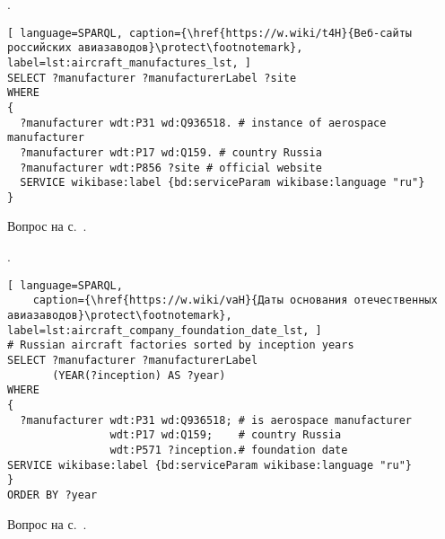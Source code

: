 \begin{task}
    \label{answer:aircraft_manufacturers}
    . 
    
	\begin{lstlisting}[ language=SPARQL, caption={\href{https://w.wiki/t4H}{Веб-сайты российских авиазаводов}\protect\footnotemark}, label=lst:aircraft_manufactures_lst, ]
SELECT ?manufacturer ?manufacturerLabel ?site
WHERE
{
  ?manufacturer wdt:P31 wd:Q936518. # instance of aerospace manufacturer
  ?manufacturer wdt:P17 wd:Q159. # country Russia
  ?manufacturer wdt:P856 ?site # official website
  SERVICE wikibase:label {bd:serviceParam wikibase:language "ru"}
}
\end{lstlisting}
    
    \small{Вопрос на с.~\pageref{lst:lang2}.}
\end{task}

\begin{task}
    \label{answer:aircraft_company_foundation_date}
    . 
    
	\begin{lstlisting}[ language=SPARQL, 
    caption={\href{https://w.wiki/vaH}{Даты основания отечественных авиазаводов}\protect\footnotemark}, label=lst:aircraft_company_foundation_date_lst, ]
# Russian aircraft factories sorted by inception years
SELECT ?manufacturer ?manufacturerLabel
       (YEAR(?inception) AS ?year)
WHERE
{
  ?manufacturer wdt:P31 wd:Q936518; # is aerospace manufacturer
                wdt:P17 wd:Q159;    # country Russia
                wdt:P571 ?inception.# foundation date
SERVICE wikibase:label {bd:serviceParam wikibase:language "ru"}
}
ORDER BY ?year
\end{lstlisting}
    
    \small{Вопрос на с.~\pageref{aircraft_question_2}.}
\end{task}

